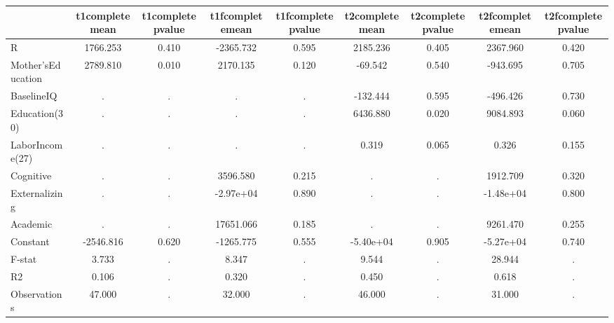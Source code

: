 \begin{table}[htbp]
\begin{tabular}{lcccccccc} \hline \hline
 & t1completemean  & t1completepvalue  & t1fcompletemean  & t1fcompletepvalue  & t2completemean  & t2completepvalue  & t2fcompletemean  & t2fcompletepvalue  \\  \hline 
R &  1766.253 &     0.410 & -2365.732 &     0.595 &  2185.236 &     0.405 &  2367.960 &     0.420 \\  
Mother'sEducation &  2789.810 &     0.010 &  2170.135 &     0.120 &   -69.542 &     0.540 &  -943.695 &     0.705 \\  
BaselineIQ &         . &         . &         . &         . &  -132.444 &     0.595 &  -496.426 &     0.730 \\  
Education(30) &         . &         . &         . &         . &  6436.880 &     0.020 &  9084.893 &     0.060 \\  
LaborIncome(27) &         . &         . &         . &         . &     0.319 &     0.065 &     0.326 &     0.155 \\  
Cognitive &         . &         . &  3596.580 &     0.215 &         . &         . &  1912.709 &     0.320 \\  
Externalizing &         . &         . & -2.97e+04 &     0.890 &         . &         . & -1.48e+04 &     0.800 \\  
Academic &         . &         . & 17651.066 &     0.185 &         . &         . &  9261.470 &     0.255 \\  
Constant & -2546.816 &     0.620 & -1265.775 &     0.555 & -5.40e+04 &     0.905 & -5.27e+04 &     0.740 \\  
F-stat &     3.733 &         . &     8.347 &         . &     9.544 &         . &    28.944 &         . \\  
R2 &     0.106 &         . &     0.320 &         . &     0.450 &         . &     0.618 &         . \\  
Observations &    47.000 &         . &    32.000 &         . &    46.000 &         . &    31.000 &         . \\  
\hline \hline \end{tabular}
\end{table}
